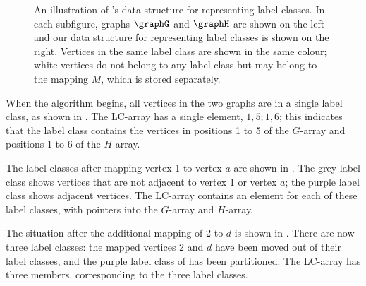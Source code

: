 \begin{figure}[htb]
{   
        \label{subfig:data-structure-c}
    }
\caption{An illustration of \McSplit's data structure for representing label classes. In each subfigure,
graphs $\graphG$ and $\graphH$ are shown on the left and our data structure for representing label classes
is shown on the right. Vertices in the same label class are shown in the same colour; white vertices
do not belong to any label class but may belong to the mapping $M$, which is stored separately.}
\label{fig:data-structure}
\end{figure}

When the algorithm begins, all vertices in the two graphs are in a single label class, as
shown in .  The LC-array has a single element, $1,5;1,6$; this indicates
that the label class contains the vertices in positions 1 to 5 of the $G$-array and positions 1 to 6
of the $H$-array.

The label classes after mapping vertex 1 to vertex $a$ are shown in .
The grey label class shows vertices that are not adjacent to vertex 1 or vertex $a$; the purple
label class shows adjacent vertices.  The LC-array contains an element for each of these label
classes, with pointers into the $G$-array and $H$-array.

The situation after the additional mapping of 2 to $d$ is shown in .
There are now three label classes: the mapped vertices 2 and $d$ have been
moved out of their label classes, and the purple label class of 
has been partitioned. The LC-array has three members,
corresponding to the three label classes.


